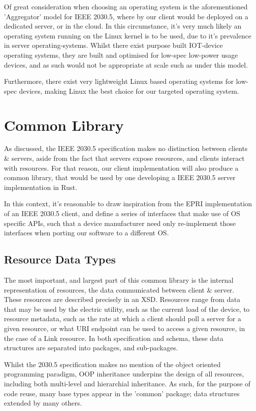 Of great consideration when choosing an operating system is the aforementioned 'Aggregator' model for IEEE 2030.5, where by our client would be deployed on a dedicated server, or in the cloud. In this circumstance, it's very much likely an operating system running on the Linux kernel is to be used, due to it's prevalence in server operating-systems.
Whilst there exist purpose built IOT-device operating systems, they are built and optimised for low-spec low-power usage devices, and as such would not be appropriate at scale such as under this model.

Furthermore, there exist very lightweight Linux based operating systems for low-spec devices, making Linux the best choice for our targeted operating system.

\section{Common Library}
As discussed, the IEEE 2030.5 specification makes no distinction between clients \& servers, aside from the fact that servers expose resources, and clients interact with resources. 
For that reason, our client implementation will also produce a common library, that would be used by one developing a IEEE 2030.5 server implementation in Rust.

In this context, it's reasonable to draw inspiration from the EPRI implementation of an IEEE 2030.5 client, and define a series of interfaces that make use of OS specific APIs, such that a device manufacturer need only re-implement those interfaces when porting our software to a different OS.

\subsection{Resource Data Types}
The most important, and largest part of this common library is the internal representation of resources, the data communicated between client \& server. These resources are described precisely in an XSD.
Resources range from data that may be used by the electric utility, such as the current load of the device, to resource metadata, such as the rate at which a client should poll a server for a given resource, or what URI endpoint can be used to access a given resource, in the case of a Link resource.
In both specification and schema, these data structures are separated into packages, and sub-packages. 

Whilst the 2030.5 specification makes no mention of the object oriented programming paradigm, OOP inheritance underpins the design of all resources, including both multi-level and hierarchial inheritance.
As such, for the purpose of code reuse, many base types appear in the 'common' package; data structures extended by many others.

